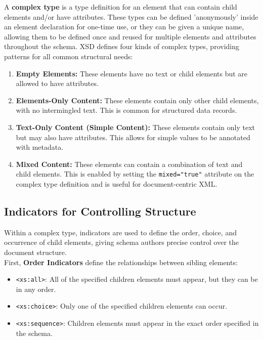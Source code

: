 \documentclass{scrbook}
\begin{document}
A \textbf{complex type} is a type definition for an element that can contain child elements and/or have attributes. These types can be defined 'anonymously' inside an element declaration for one-time use, or they can be given a unique name, allowing them to be defined once and reused for multiple elements and attributes throughout the schema. XSD defines four kinds of complex types, providing patterns for all common structural needs:

\begin{enumerate}
    \item
    \textbf{Empty Elements:} These elements have no text or child elements but are allowed to have attributes.

    \item 
    \textbf{Elements-Only Content:} These elements contain only other child elements, with no intermingled text. This is common for structured data records.

    \item 
    \textbf{Text-Only Content (Simple Content):} These elements contain only text but may also have attributes. This allows for simple values to be annotated with metadata.

    \item 
    \textbf{Mixed Content:} These elements can contain a combination of text and child elements. This is enabled by setting the \texttt{mixed="true"} attribute on the complex type definition and is useful for document-centric XML.
\end{enumerate}

\subsection{Indicators for Controlling Structure}

Within a complex type, indicators are used to define the order, choice, and occurrence of child elements, giving schema authors precise control over the document structure. \\

First, \textbf{Order Indicators} define the relationships between sibling elements:

\begin{itemize}
    \item 
    \texttt{<xs:all>}: All of the specified children elements must appear, but they can be in any order.

    \item 
    \texttt{<xs:choice>}: Only one of the specified children elements can occur.
    
    \item 
    \texttt{<xs:sequence>}: Children elements must appear in the exact order specified in the schema.
\end{itemize}
\end{document}
